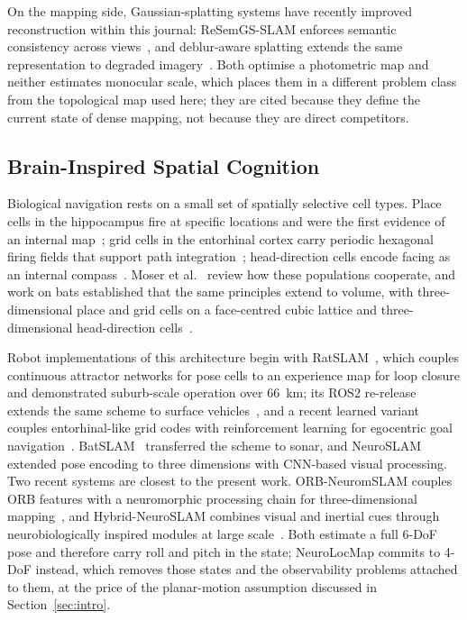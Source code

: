 On the mapping side, Gaussian-splatting systems have recently improved reconstruction within this journal: ReSemGS-SLAM enforces semantic consistency across views~\cite{zhao2026resemgs}, and deblur-aware splatting extends the same representation to degraded imagery~\cite{qin2025deblur}. Both optimise a photometric map and neither estimates monocular scale, which places them in a different problem class from the topological map used here; they are cited because they define the current state of dense mapping, not because they are direct competitors.

\subsection{Brain-Inspired Spatial Cognition}
\label{sec:related_bio}

Biological navigation rests on a small set of spatially selective cell types. Place cells in the hippocampus fire at specific locations and were the first evidence of an internal map~\cite{OKeefe1971}; grid cells in the entorhinal cortex carry periodic hexagonal firing fields that support path integration~\cite{Hafting2005}; head-direction cells encode facing as an internal compass~\cite{Taube1990}. Moser et al.~\cite{Moser2017} review how these populations cooperate, and work on bats established that the same principles extend to volume, with three-dimensional place and grid cells on a face-centred cubic lattice and three-dimensional head-direction cells~\cite{finkelstein2015three,finkelstein2016three}.

Robot implementations of this architecture begin with RatSLAM~\cite{milford2004ratslam,milford2008mapping}, which couples continuous attractor networks for pose cells to an experience map for loop closure and demonstrated suburb-scale operation over 66~km; its ROS2 re-release extends the same scheme to surface vehicles~\cite{coelho2025openratslam2}, and a recent learned variant couples entorhinal-like grid codes with reinforcement learning for egocentric goal navigation~\cite{walczak2025eden}. BatSLAM~\cite{steckel2013batslam} transferred the scheme to sonar, and NeuroSLAM~\cite{Yu2019} extended pose encoding to three dimensions with CNN-based visual processing. Two recent systems are closest to the present work. ORB-NeuromSLAM couples ORB features with a neuromorphic processing chain for three-dimensional mapping~\cite{shen2024orbneuro}, and Hybrid-NeuroSLAM combines visual and inertial cues through neurobiologically inspired modules at large scale~\cite{lu2025hybridneuro}. Both estimate a full 6-DoF pose and therefore carry roll and pitch in the state; NeuroLocMap commits to 4-DoF instead, which removes those states and the observability problems attached to them, at the price of the planar-motion assumption discussed in Section~\ref{sec:intro}.

